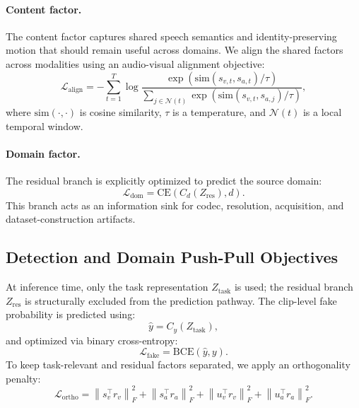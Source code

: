 \documentclass{article}
\begin{document}
\paragraph{Content factor.}
The content factor captures shared speech semantics and identity-preserving motion that should remain useful across domains. We align the shared factors across modalities using an audio-visual alignment objective:
\begin{equation}
\mathcal{L}_{\mathrm{align}} = - \sum_{t=1}^T
\log
\frac{\exp(\mathrm{sim}(s_{v,t}, s_{a,t})/\tau)}
{\sum_{j \in \mathcal{N}(t)} \exp(\mathrm{sim}(s_{v,t}, s_{a,j})/\tau)},
\end{equation}
where $\mathrm{sim}(\cdot,\cdot)$ is cosine similarity, $\tau$ is a temperature, and $\mathcal{N}(t)$ is a local temporal window.
\vspace{-0.7em}
\paragraph{Domain factor.}
The residual branch is explicitly optimized to predict the source domain:
\begin{equation}
\mathcal{L}_{\mathrm{dom}} = \mathrm{CE}(C_d(Z_{\mathrm{res}}), d).
\end{equation}
This branch acts as an information sink for codec, resolution, acquisition, and dataset-construction artifacts.

\subsection{Detection and Domain Push-Pull Objectives}
\vspace{-0.7em}
At inference time, only the task representation $Z_{\mathrm{task}}$ is used; the residual branch $Z_{\mathrm{res}}$ is structurally excluded from the prediction pathway. The clip-level fake probability is predicted using: 
\begin{equation}
\hat{y} = C_y(Z_{\mathrm{task}}),
\end{equation}
and optimized via binary cross-entropy:
\begin{equation}
\mathcal{L}_{\mathrm{fake}} = \mathrm{BCE}(\hat{y}, y).
\end{equation}
To keep task-relevant and residual factors separated, we apply an orthogonality penalty:
\begin{equation}
\mathcal{L}_{\mathrm{ortho}} =
\left\| s_v^\top r_v \right\|_F^2
+ \left\| s_a^\top r_a \right\|_F^2
+ \left\| u_v^\top r_v \right\|_F^2
+ \left\| u_a^\top r_a \right\|_F^2.
\end{equation}
\end{document}
